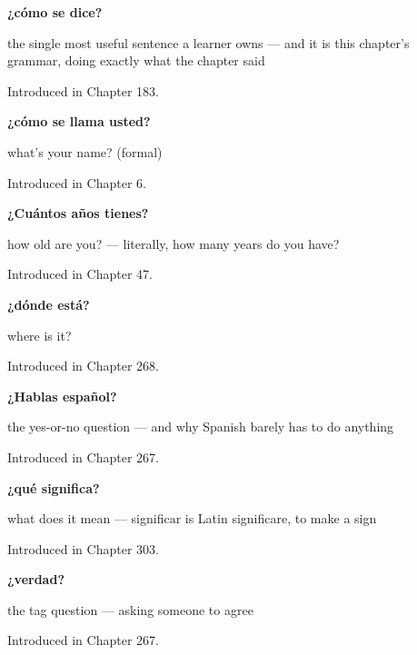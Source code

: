 \noindent\begin{minipage}[t]{\linewidth}
\raggedright
\textbf{¿cómo se dice?}\par
\small the single most useful sentence a learner owns — and it is this chapter's grammar, doing exactly what the chapter said\par
\footnotesize Introduced in Chapter 183.
\end{minipage}\par\medskip

\noindent\begin{minipage}[t]{\linewidth}
\raggedright
\textbf{¿cómo se llama usted?}\par
\small what's your name? (formal)\par
\footnotesize Introduced in Chapter 6.
\end{minipage}\par\medskip

\noindent\begin{minipage}[t]{\linewidth}
\raggedright
\textbf{¿Cuántos años tienes?}\par
\small how old are you? — literally, how many years do you have?\par
\footnotesize Introduced in Chapter 47.
\end{minipage}\par\medskip

\noindent\begin{minipage}[t]{\linewidth}
\raggedright
\textbf{¿dónde está?}\par
\small where is it?\par
\footnotesize Introduced in Chapter 268.
\end{minipage}\par\medskip

\noindent\begin{minipage}[t]{\linewidth}
\raggedright
\textbf{¿Hablas español?}\par
\small the yes-or-no question — and why Spanish barely has to do anything\par
\footnotesize Introduced in Chapter 267.
\end{minipage}\par\medskip

\noindent\begin{minipage}[t]{\linewidth}
\raggedright
\textbf{¿qué significa?}\par
\small what does it mean — significar is Latin significare, to make a sign\par
\footnotesize Introduced in Chapter 303.
\end{minipage}\par\medskip

\noindent\begin{minipage}[t]{\linewidth}
\raggedright
\textbf{¿verdad?}\par
\small the tag question — asking someone to agree\par
\footnotesize Introduced in Chapter 267.
\end{minipage}\par\medskip
